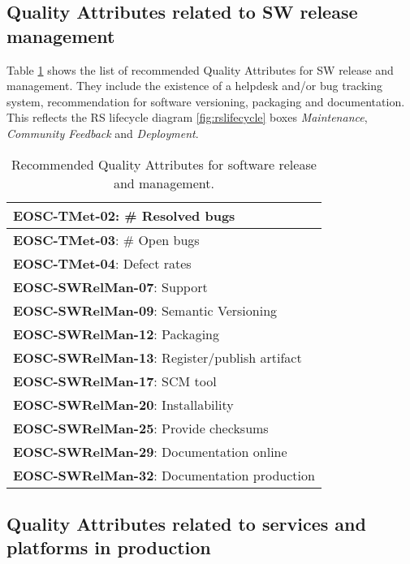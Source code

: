 \subsection{Quality Attributes related to SW release management}

Table \ref{tab:rs_rel} shows the list of recommended Quality Attributes for SW release and management. They include the existence of a helpdesk and/or bug tracking system, recommendation for software versioning, packaging and documentation. This reflects the RS lifecycle diagram \ref{fig:rslifecycle} boxes \textit{Maintenance}, \textit{Community Feedback} and \textit{Deployment}.

\begin{center}
\begin{table}[h]
    \small
    \begin{tabular}{|p{\linewidth}|} \hline

        \textbf{EOSC-TMet-02}: \# Resolved bugs \\ \hline
        \textbf{EOSC-TMet-03}: \# Open bugs \\ \hline
        \textbf{EOSC-TMet-04}: Defect rates \\ \hline
        \textbf{EOSC-SWRelMan-07}: Support \\ \hline
        \textbf{EOSC-SWRelMan-09}: Semantic Versioning \\ \hline
        \textbf{EOSC-SWRelMan-12}: Packaging \\ \hline
        \textbf{EOSC-SWRelMan-13}: Register/publish artifact \\ \hline
        \textbf{EOSC-SWRelMan-17}: SCM tool \\ \hline
        \textbf{EOSC-SWRelMan-20}: Installability \\ \hline
        \textbf{EOSC-SWRelMan-25}: Provide checksums \\ \hline
        \textbf{EOSC-SWRelMan-29}: Documentation online \\ \hline
        \textbf{EOSC-SWRelMan-32}: Documentation production \\ \hline

    \end{tabular}
    \caption{Recommended Quality Attributes for software release and management.}
    \label{tab:rs_rel}
\end{table}
\end{center}

\subsection{Quality Attributes related to services and platforms in production}

